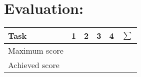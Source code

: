 \section*{\hspace*{2mm}Evaluation:} 
\begin{center}
\begin{tabular}{p{4cm}P{1.0cm}P{1.0cm}P{1.0cm}P{1.0cm}P{1.0cm}}
\toprule
Task & 1 & 2 & 3 & 4 & $\sum$ \\
\midrule 
Maximum score &  &  &  &   &  \\
Achieved score & \\
\bottomrule
\end{tabular}
\end{center}